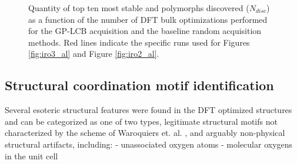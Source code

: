 \begin{figure}[!htb]
\centering
{}
\caption{\label{fig:disc_rate}
%
Quantity of top ten most stable \IrOtwo and \IrOthree polymorphs discovered ($N_{disc}$) as a function of the number of DFT bulk optimizations performed for the GP-LCB acquisition and the baseline random acquisition methods.
%
Red lines indicate the specific runs used for Figures \ref{fig:iro3_al} and Figure \ref{fig:iro2_al}.
}
\end{figure}


\subsection{Structural coordination motif identification} %
%


%
Several esoteric structural features were found in the DFT optimized structures and can be categorized as one of two types,
legitimate structural motifs not characterized by the scheme of Waroquiers et. al. \cite{Waroquiers2017}, and arguably non-physical structural artifacts, including:
- unassociated oxygen atoms
- molecular oxygens in the unit cell


